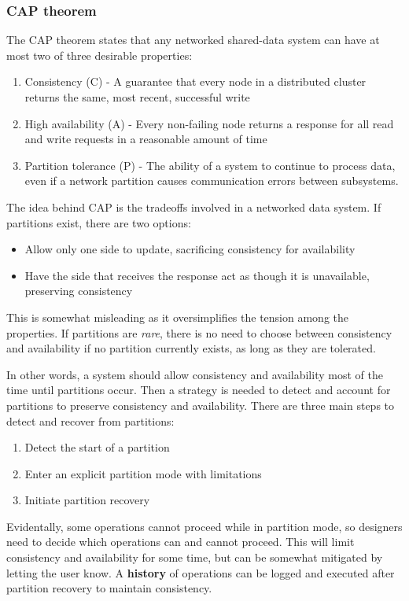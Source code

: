 \documentclass{sty/SizheArticle}
\begin{document}
\subsubsection{CAP theorem}
The CAP theorem states that any networked shared-data system can have at
most two of three desirable properties:
\begin{enumerate}
\item Consistency (C) - A guarantee that every node in a distributed cluster
returns the same, most recent, successful write
\item High availability (A) - Every non-failing node returns a response
for all read and write requests in a reasonable amount of time
\item Partition tolerance (P) - The ability of a system to continue to
process data, even if a network partition causes communication errors
between subsystems.
\end{enumerate}
The idea behind CAP is the tradeoffs involved in a networked data system. If
partitions exist, there are two options:
\begin{itemize}
\item Allow only one side to update, sacrificing consistency for availability
\item Have the side that receives the response act as though it is unavailable,
preserving consistency
\end{itemize}
This is somewhat misleading as it oversimplifies the tension among the properties.
If partitions are \textit{rare}, there is no need to choose between
consistency and availability if no partition currently exists, as long as
they are tolerated.

In other words, a system should allow consistency and availability most of the
time until partitions occur. Then a strategy is needed to detect and account
for partitions to preserve consistency and availability. There are three
main steps to detect and recover from partitions:
\begin{enumerate}
\item Detect the start of a partition
\item Enter an explicit partition mode with limitations
\item Initiate partition recovery
\end{enumerate}


Evidentally, some operations cannot proceed while in partition mode, so
designers need to decide which operations can and cannot proceed. This
will limit consistency and availability for some time, but can be
somewhat mitigated by letting the user know. A \textbf{history} of
operations can be logged and executed after partition recovery to
maintain consistency.
\end{document}
